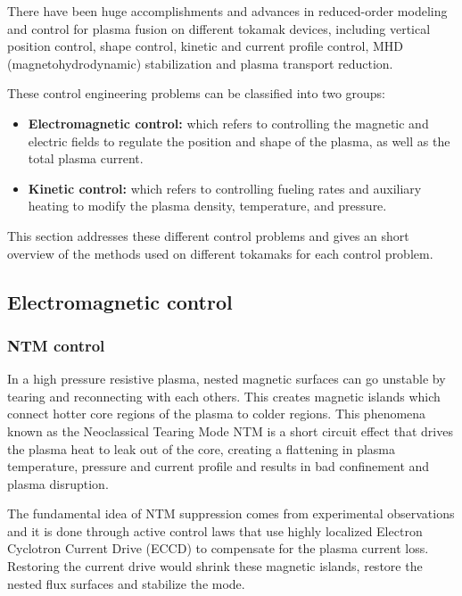 \documentclass[12pt,lot, lof]{puthesis}
\begin{document}
There have been huge accomplishments and advances in reduced-order modeling and control for plasma fusion on different tokamak devices, including vertical position control, shape control, kinetic and current profile control, MHD (magnetohydrodynamic) stabilization and plasma transport reduction.

These control engineering problems can be classified into two groups: 
\begin{itemize}
\item \textbf{Electromagnetic control:} which refers to controlling the magnetic and electric fields to regulate the position and shape of the plasma, as well as the total plasma current. 

\item \textbf{Kinetic control:} which refers to controlling fueling rates and auxiliary heating to modify the plasma density, temperature, and pressure.
\end{itemize}
This section addresses these different control problems and gives an short overview of the methods used on different tokamaks for each control problem.

\subsection{Electromagnetic control}

\subsubsection{NTM control}
In a high pressure resistive plasma, nested magnetic surfaces can go unstable by tearing and reconnecting with each others. This creates magnetic islands which connect hotter core regions of the plasma to colder regions. This phenomena known as the Neoclassical Tearing Mode NTM is a short circuit effect that drives the plasma heat to leak out of the core, creating a flattening in plasma temperature, pressure and current profile and results in bad confinement and plasma disruption.

The fundamental idea of NTM suppression comes from experimental observations and it is done through active control laws that use highly localized Electron Cyclotron Current Drive (ECCD) to compensate for the plasma current loss. Restoring the current drive would shrink these magnetic islands, restore the nested flux surfaces and stabilize the mode.
\end{document}
